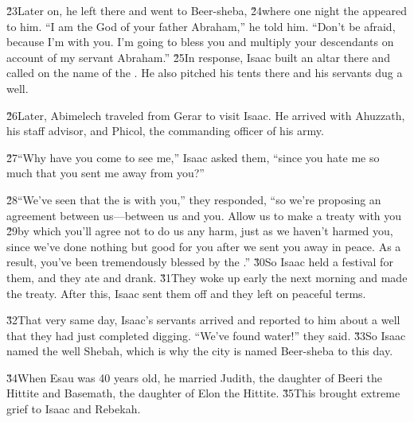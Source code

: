 \v{23}Later on, he left there and went to Beer-sheba, \v{24}where one night the  appeared to him. ``I am the God of your father Abraham,'' he told him. ``Don't be afraid, because I'm with you. I'm going to bless you and multiply your descendants on account of my servant Abraham.'' \v{25}In response, Isaac built an altar there and called on the name of the . He also pitched his tents there and his servants dug a well.

\v{26}Later, Abimelech traveled from Gerar to visit Isaac. He arrived with Ahuzzath, his staff advisor, and Phicol, the commanding officer of his army.

\v{27}``Why have you come to see me,'' Isaac asked them, ``since you hate me so much that you sent me away from you?''

\v{28}``We've seen that the  is with you,'' they responded, ``so we're proposing an agreement between us---between us and you. Allow us to make a treaty with you \v{29}by which you'll agree not to do us any harm, just as we haven't harmed you, since we've done nothing but good for you after we sent you away in peace. As a result, you've been tremendously blessed by the .'' \v{30}So Isaac held a festival for them, and they ate and drank. \v{31}They woke up early the next morning and made the treaty. After this, Isaac sent them off and they left on peaceful terms.

\v{32}That very same day, Isaac's servants arrived and reported to him about a well that they had just completed digging. ``We've found water!'' they said. \v{33}So Isaac named the well Shebah, which is why the city is named Beer-sheba to this day.

\v{34}When Esau was 40 years old, he married Judith, the daughter of Beeri the Hittite and Basemath, the daughter of Elon the Hittite. \v{35}This brought extreme grief to Isaac and Rebekah.

